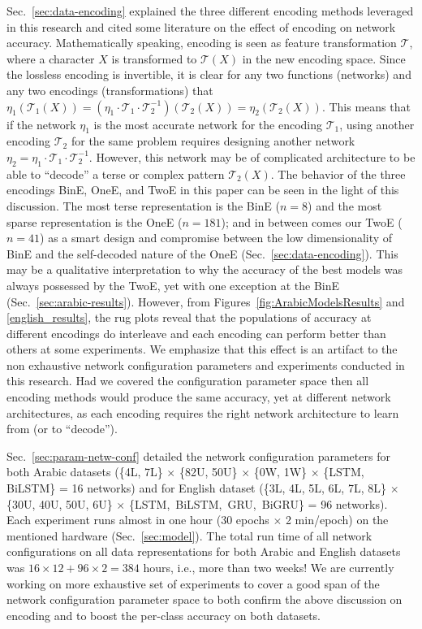 \documentclass[journal,10pt,twocolumns,letter]{IEEEtran}
\begin{document}
Sec.~\ref{sec:data-encoding} explained the three different encoding methods leveraged in this
research and cited some literature on the effect of encoding on network accuracy. Mathematically
speaking, encoding is seen as feature transformation $\mathcal{T}$, where a character $X$ is
transformed to $\mathcal{T}(X)$ in the new encoding space. Since the lossless encoding is
invertible, it is clear for any two functions (networks) and any two encodings (transformations)
that
$\eta_1\left(\mathcal{T}_1(X)\right) = \left(\eta_1\cdot\mathcal{T}_1\cdot
  \mathcal{T}_2^{-1}\right)\left(\mathcal{T}_2(X)\right) =
\eta_2\left(\mathcal{T}_2(X)\right)$. This means that if the network $\eta_1$ is the most accurate
network for the encoding $\mathcal{T}_1$, using another encoding $\mathcal{T}_2$ for the same
problem requires designing another network
$\eta_2 = \eta_1\cdot\mathcal{T}_1\cdot \mathcal{T}_2^{-1}$. However, this network may be of
complicated architecture to be able to ``decode'' a terse or complex pattern $\mathcal{T}_2(X)$. The
behavior of the three encodings BinE, OneE, and TwoE in this paper can be seen in the light of this
discussion. The most terse representation is the BinE ($n=8$) and the most sparse representation is
the OneE ($n=181$); and in between comes our TwoE ($n=41$) as a smart design and compromise between
the low dimensionality of BinE and the self-decoded nature of the OneE
(Sec.~\ref{sec:data-encoding}). This may be a qualitative interpretation to why the accuracy of the
best models was always possessed by the TwoE, yet with one exception at the BinE
(Sec.~\ref{sec:arabic-results}). However, from Figures~\ref{fig:ArabicModelsResults} and
\ref{english_results}, the rug plots reveal that the populations of accuracy at different
encodings do interleave and each encoding can perform better than others at some experiments. We
emphasize that this effect is an artifact to the non exhaustive network configuration parameters and
experiments conducted in this research. Had we covered the configuration parameter space then all
encoding methods would produce the same accuracy, yet at different network architectures, as each
encoding requires the right network architecture to learn from (or to ``decode'').


Sec.~\ref{sec:param-netw-conf} detailed the network configuration parameters for both Arabic
datasets (\{4L, 7L\} $\times$ \{82U, 50U\} $\times$ \{0W, 1W\} $\times$ \{LSTM, BiLSTM\} = 16
networks) and for English dataset (\{3L, 4L, 5L, 6L, 7L, 8L\} $\times$ \{30U, 40U, 50U, 6U\}
$\times$ \{LSTM,\ BiLSTM,\ GRU,\ BiGRU\} = 96 networks). Each experiment runs almost in one hour (30
epochs $\times$ 2 min/epoch) on the mentioned hardware (Sec.~\ref{sec:model}). The total run time of
all network configurations on all data representations for both Arabic and English datasets was
$16\times 12+96\times 2 = 384$ hours, i.e., more than two weeks! We are currently working on more
exhaustive set of experiments to cover a good span of the network configuration parameter space to
both confirm the above discussion on encoding and to boost the per-class accuracy on both datasets.
\end{document}
